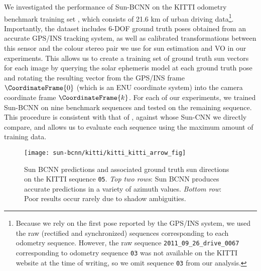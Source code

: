 We investigated the performance of Sun-BCNN on the KITTI odometry benchmark training set \citep{Geiger2012-fq,Geiger2013-ky}, which consists of 21.6 km of urban driving data\footnote{Because we rely on the first pose reported by the GPS/INS system, we used the raw (rectified and synchronized) sequences corresponding to each odometry sequence. However, the raw sequence \texttt{2011\_09\_26\_drive\_0067} corresponding to odometry sequence \texttt{03} was not available on the KITTI website at the time of writing, so we omit sequence \texttt{03} from our analysis.}.
Importantly, the dataset includes 6-DOF ground truth poses obtained from an accurate GPS/INS tracking system, as well as calibrated transformations between this sensor and the colour stereo pair we use for sun estimation and VO in our experiments.
This allows us to create a training set of ground truth sun vectors for each image by querying the solar ephemeris model at each ground truth pose and rotating the resulting vector from the GPS/INS frame $\CoordinateFrame{0}$ (which is an ENU coordinate system) into the camera coordinate frame $\CoordinateFrame{k}$.
For each of our experiments, we trained Sun-BCNN on nine benchmark sequences and tested on the remaining sequence.
This procedure is consistent with that of \citet{Ma2016-at}, against whose Sun-CNN we directly compare, and allows us to evaluate each sequence using the maximum amount of training data.

\begin{figure*}[h]
	\centering
	\texttt{[image: sun-bcnn/kitti/kitti\_kitti\_arrow\_fig]}	
	\caption{Sun BCNN predictions and associated ground truth sun directions on the KITTI sequence \texttt{05}. \emph{Top two rows}: Sun BCNN produces accurate predictions in a variety of azimuth values. \emph{Bottom row}: Poor results occur rarely due to shadow ambiguities.}
	\label{fig:kitti_arrows}
\end{figure*}

